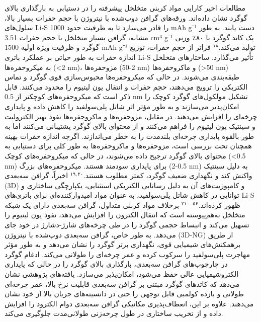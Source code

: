 \documentclass[12pt,a4paper,twocolumn]{article} %
\newcommand{\persian}[1]{\textfarsi{#1}}
\newcommand{\english}[1]{\textenglish{#1}}
\begin{document}
\persian{
مطالعات اخیر کارایی مواد کربنی متخلخل پیشرفته را در دستیابی به بارگذاری بالای گوگرد نشان داده‌اند. ورقه‌های گرافن دوپ‌شده با نیتروژن با حجم حفرات بسیار بالا، سلول‌های \english{Li-S} را قادر می‌سازد تا به ظرفیت حدود \english{1000 mAh g⁻¹} دست یابند. به طور مشابه، گرافن بسیار متخلخل با حجم حفرات \english{3.51 cm³ g⁻¹} یک کاتد گوگرد با ۸۰٪ وزنی گوگرد و ظرفیت ویژه اولیه \english{1500 mAh g⁻¹} تولید می‌کند.$^{۱۸}$
}
\persian{
فراتر از حجم حفرات، توزیع اندازه حفرات به طور حیاتی بر عملکرد باتری \english{Li-S} تأثیر می‌گذارد. ساختارهای متخلخل به میکروحفره‌ها (\english{<2 nm})، مزوحفره‌ها (\english{2-50 nm}) و ماکروحفره‌ها (\english{>50 nm}) طبقه‌بندی می‌شوند. در حالی که میکروحفره‌ها محبوس‌سازی قوی گوگرد و تماس الکتریکی را ترویج می‌دهند، حجم حفرات و انتقال یون لیتیوم را محدود می‌کنند. قابل ذکر است که میکروحفره‌های کوچکتر از \english{0.5 nm} تشکیل مولکول‌های گوگرد کوچک را امکان‌پذیر می‌سازند و به طور مؤثر اثر شاتل پلی‌سولفید را کاهش داده و پایداری چرخه‌ای را افزایش می‌دهند. در مقابل، مزوحفره‌ها و ماکروحفره‌ها نفوذ بهتر الکترولیت و سینتیک یون لیتیوم را فراهم می‌کنند و از محتوای بالای گوگرد پشتیبانی می‌کنند اما به طور بالقوه پایداری چرخه‌ای بلندمدت را به خطر می‌اندازند. اگرچه اندازه حفرات بهینه همچنان تحت بررسی است، مزوحفره‌ها و ماکروحفره‌ها به طور کلی برای دستیابی به محتوای بالای گوگرد ترجیح داده می‌شوند، در حالی که میکروحفره‌های کوچک (\english{<0.5 nm}) برای پایداری سودمند هستند. میکروحفره‌های بزرگ (\english{0.5-2 nm}) به دلیل سینتیک واکنش کند و نگهداری ضعیف گوگرد، کمتر مطلوب هستند.$^{۱۹,۲۰}$
}
\persian{
اخیراً، گرافن سه‌بعدی (\english{3D}) و کامپوزیت‌های آن به دلیل رسانایی الکتریکی استثنایی، یکپارچگی ساختاری و توانایی در کاهش شاتل پلی‌سولفید، به عنوان مواد امیدوارکننده‌ای برای باتری‌های \english{Li-S} ظهور کرده‌اند.$^{۲۱-۵۶}$ برخلاف مواد کربنی متداول، گرافن سه‌بعدی دارای یک شبکه متخلخل به‌هم‌پیوسته است که انتقال الکترون را افزایش می‌دهد، نفوذ یون لیتیوم را تسهیل می‌کند و انبساط حجمی گوگرد را در طی چرخه‌های شارژ-دشارژ در خود جای می‌دهد. به طور خاص، گرافن سه‌بعدی دوپ‌شده با نیتروژن (\english{3D-NG}) از طریق برهمکنش‌های شیمیایی قوی، نگهداری برتر گوگرد را نشان می‌دهد و به طور مؤثر مهاجرت پلی‌سولفید را سرکوب کرده و عمر چرخه‌ای را طولانی می‌کند. ادغام گوگرد در چارچوب‌های گرافن سه‌بعدی، بارگذاری بالای گوگرد را در حالی که پایداری الکتروشیمیایی عالی حفظ می‌شود، امکان‌پذیر می‌سازد. یافته‌های پژوهشی نشان می‌دهد که کاتدهای گوگرد مبتنی بر گرافن سه‌بعدی قابلیت نرخ بالا، عمر چرخه‌ای طولانی و بازده کولمبی قابل توجهی را حتی در دانسیته‌های جریان بالا از خود نشان می‌دهند. علاوه بر این، انعطاف‌پذیری مکانیکی گرافن سه‌بعدی دوام الکترود را افزایش داده و از تخریب ساختاری در طول چرخه‌زنی طولانی‌مدت جلوگیری می‌کند.
}
\end{document}
